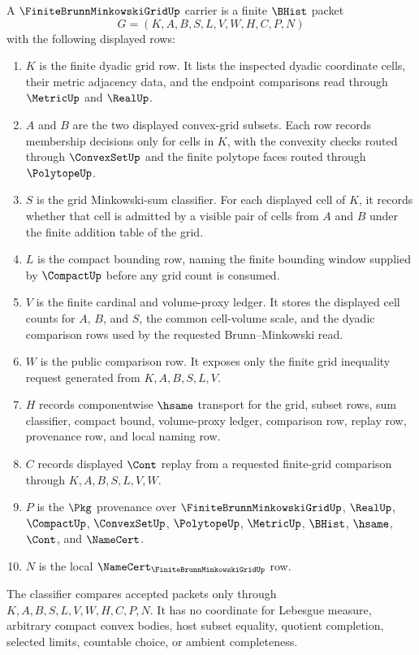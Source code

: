 \begin{definition}
\label{def:finite-brunn-minkowski-grid-carrier}
A $\FiniteBrunnMinkowskiGridUp$ carrier is a finite $\BHist$ packet
$$
G=(K,A,B,S,L,V,W,H,C,P,N)
$$
with the following displayed rows:
\begin{enumerate}
\item $K$ is the finite dyadic grid row. It lists the inspected dyadic coordinate cells, their metric adjacency data, and the endpoint comparisons read through $\MetricUp$ and $\RealUp$.
\item $A$ and $B$ are the two displayed convex-grid subsets. Each row records membership decisions only for cells in $K$, with the convexity checks routed through $\ConvexSetUp$ and the finite polytope faces routed through $\PolytopeUp$.
\item $S$ is the grid Minkowski-sum classifier. For each displayed cell of $K$, it records whether that cell is admitted by a visible pair of cells from $A$ and $B$ under the finite addition table of the grid.
\item $L$ is the compact bounding row, naming the finite bounding window supplied by $\CompactUp$ before any grid count is consumed.
\item $V$ is the finite cardinal and volume-proxy ledger. It stores the displayed cell counts for $A$, $B$, and $S$, the common cell-volume scale, and the dyadic comparison rows used by the requested Brunn--Minkowski read.
\item $W$ is the public comparison row. It exposes only the finite grid inequality request generated from $K,A,B,S,L,V$.
\item $H$ records componentwise $\hsame$ transport for the grid, subset rows, sum classifier, compact bound, volume-proxy ledger, comparison row, replay row, provenance row, and local naming row.
\item $C$ records displayed $\Cont$ replay from a requested finite-grid comparison through $K,A,B,S,L,V,W$.
\item $P$ is the $\Pkg$ provenance over $\FiniteBrunnMinkowskiGridUp$, $\RealUp$, $\CompactUp$, $\ConvexSetUp$, $\PolytopeUp$, $\MetricUp$, $\BHist$, $\hsame$, $\Cont$, and $\NameCert$.
\item $N$ is the local $\NameCert_{\FiniteBrunnMinkowskiGridUp}$ row.
\end{enumerate}
The classifier compares accepted packets only through $K,A,B,S,L,V,W,H,C,P,N$. It has no coordinate for Lebesgue measure, arbitrary compact convex bodies, host subset equality, quotient completion, selected limits, countable choice, or ambient completeness.
\end{definition}

